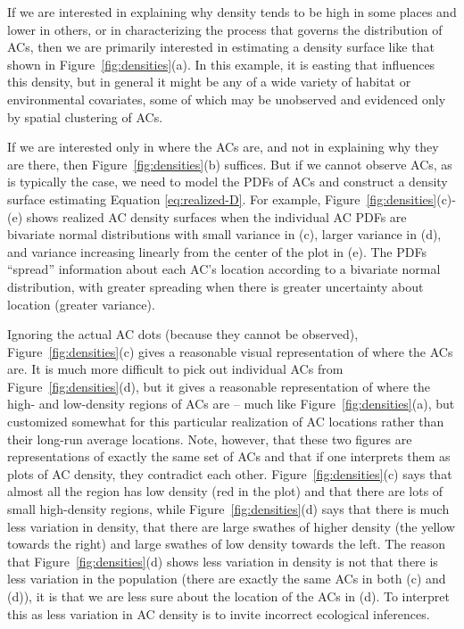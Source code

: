 \documentclass[useAMS,usenatbib,referee]{biom}
\begin{document}
If we are interested in explaining why density tends to be high in some places and lower in others, or in characterizing the process that governs the distribution of ACs, then we are primarily interested in estimating a density surface like that shown in Figure~\ref{fig:densities}(a). In this example, it is easting that influences this density, but in general it might be any of a wide variety of habitat or environmental covariates, some of which may be unobserved and evidenced only by spatial clustering of ACs. 

If we are interested only in where the ACs are, and not in explaining why they are there, then Figure~\ref{fig:densities}(b) suffices. But if we cannot observe ACs, as is typically the case, we need to model the PDFs of ACs and construct a density surface estimating Equation \eqref{eq:realized-D}. For example, Figure~\ref{fig:densities}(c)-(e) shows realized AC density surfaces when the individual AC PDFs are bivariate normal distributions with small variance in (c), larger variance in (d), and variance increasing linearly from the center of the plot in (e). The PDFs ``spread'' information about each AC's location according to a bivariate normal distribution, with greater spreading when there is greater uncertainty about location (greater variance).

Ignoring the actual AC dots (because they cannot be observed), Figure~\ref{fig:densities}(c) gives a reasonable visual representation of where the ACs are. It is much more difficult to pick out individual ACs from Figure~\ref{fig:densities}(d), but it gives a reasonable representation of where the high- and low-density regions of ACs are -- much like Figure~\ref{fig:densities}(a), but customized somewhat for this particular realization of AC locations rather than their long-run average locations. Note, however, that these two figures are representations of exactly the same set of ACs and that if one interprets them as plots of AC density, they contradict each other. Figure~\ref{fig:densities}(c) says that almost all the region has low density (red in the plot) and that there are lots of small high-density regions, while Figure~\ref{fig:densities}(d) says that there is much less variation in density, that there are large swathes of higher density (the yellow towards the right) and large swathes of low density towards the left. The reason that Figure~\ref{fig:densities}(d) shows less variation in density is not that there is less variation in the population (there are exactly the same ACs in both (c) and (d)), it is that we are less sure about the location of the ACs in (d). To interpret this as less variation in AC density is to invite incorrect ecological inferences.
\end{document}
